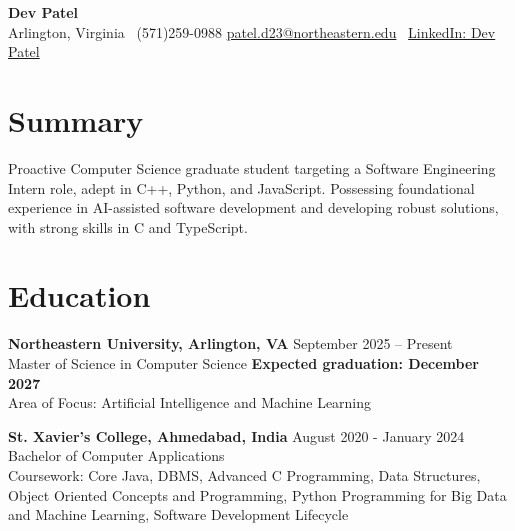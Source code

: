 \documentclass[a4paper,10pt]{article}
\begin{document}
\begin{center}
\vspace{-3mm}
    \fontsize{16}{18}\selectfont \textbf{Dev Patel} \\
    \vspace{0mm}
    \normalsize Arlington, Virginia \textbar\ (571)259-0988  \textbar       \href{mailto:patel.d23@northeastern.edu}{patel.d23@northeastern.edu} \textbar\ \href{https://www.linkedin.com/in/devxpatel//}{LinkedIn: Dev Patel} \\
\end{center}

\section*{Summary}
Proactive Computer Science graduate student targeting a Software Engineering Intern role, adept in C++, Python, and JavaScript. Possessing foundational experience in AI-assisted software development and developing robust solutions, with strong skills in C and TypeScript.

\vspace{0 mm}
\section*{Education}
\textbf{Northeastern University, Arlington, VA} \hfill September 2025 -- Present\\
Master of Science in Computer Science \hfill \textbf{Expected graduation: December 2027} \\
Area of Focus: Artificial Intelligence and Machine Learning

\vspace{1 mm} %
\textbf{St. Xavier's College, Ahmedabad, India} \hfill August 2020 - January 2024 \\
Bachelor of Computer Applications\\
Coursework: Core Java, DBMS, Advanced C Programming, Data Structures, Object Oriented Concepts and Programming, Python Programming for Big Data and Machine Learning, Software Development Lifecycle
\end{document}
